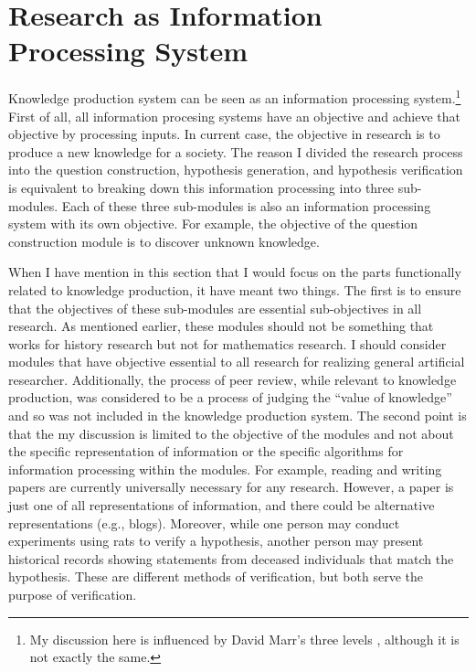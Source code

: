 \documentclass{book}
\begin{document}
\section{Research as Information Processing System}
Knowledge production system can be seen as an information processing system.\footnote{My discussion here is influenced by David Marr's three levels  \cite{marr2010vision}, although it is not exactly the same.} First of all, all information procesing systems have an objective and achieve that objective by processing inputs. In current case, the objective in research is to produce a new knowledge for a society. The reason I divided the research process into the question construction, hypothesis generation, and hypothesis verification is equivalent to breaking down this information processing into three sub-modules. Each of these three sub-modules is also an information processing system with its own objective. For example, the objective of the question construction module is to discover unknown knowledge.

When I have mention in this section that I would focus on the parts functionally related to knowledge production, it have meant two things. The first is to ensure that the objectives of these sub-modules are essential sub-objectives in all research. As mentioned earlier, these modules should not be something that works for history research but not for mathematics research. I should consider modules that have objective essential to all research for realizing general artificial researcher. Additionally, the process of peer review, while relevant to knowledge production, was considered to be a process of judging the ``value of knowledge'' and so was not included in the knowledge production system. The second point is that the my discussion is limited to the objective of the modules and not about the specific representation of information or the specific algorithms for information processing within the modules. For example, reading and writing papers are currently universally necessary for any research. However, a paper is just one of all representations of information, and there could be alternative representations (e.g., blogs). Moreover, while one person may conduct experiments using rats to verify a hypothesis, another person may present historical records showing statements from deceased individuals that match the hypothesis. These are different methods of verification, but both serve the purpose of verification.

\end{document}
